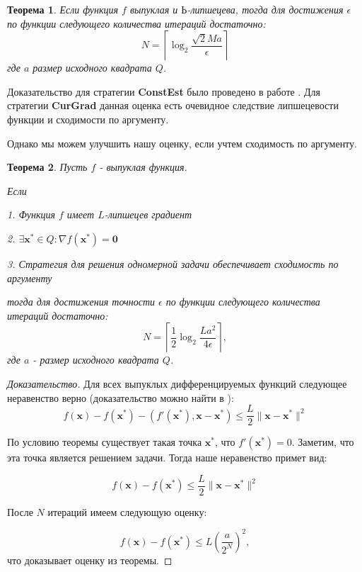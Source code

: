 \documentclass[12pt]{article}
\newtheorem{theorem}{Теорема}[section]
\begin{document}
\begin{theorem}
Если функция $f$ выпуклая и $Ь$-липшецева, тогда для достижения $\epsilon$ по функции следующего количества итераций достаточно:
\begin{equation}\label{NI1}N = \left\lceil\log_2\frac{\sqrt{2}Ma}{\epsilon}\right\rceil\end{equation}
где $a$ размер исходного квадрата $Q$.
\end{theorem}

Доказательство для стратегии \textbf{ConstEst} было проведено в работе \cite{StonPas}. Для стратегии \textbf{CurGrad} данная оценка есть очевидное следствие липшецевости функции и сходимости по аргументу.

Однако мы можем улучшить нашу оценку, если учтем сходимость по аргументу.
\begin{theorem}
Пусть $f$ - выпуклая функция.

Если

1. Функция $f$ имеет $L$-липшецев градиент

2. $\exists \textbf{x}^*\in Q: \nabla f(\textbf{x}^*) = \textbf{0}$

3. Стратегия для решения одномерной задачи обеспечивает сходимость по аргументу

тогда для достижения точности $\epsilon$ по функции следующего количества итераций достаточно:
\begin{equation}\label{NI3}N = \left\lceil\frac{1}{2}\log_2\frac{La^2}{4\epsilon}\right\rceil,
\end{equation}
где $a$ - размер исходного квадрата $Q$.
\end{theorem}

\begin{proof}[Доказательство]
Для всех выпуклых дифференцируемых функций следующее неравенство верно (доказательство можно найти в \cite{Nesterov}):
$$f(\textbf{x}) - f(\textbf{x}^*) - (f'(\textbf{x}^*), \textbf{x} - \textbf{x}^*) \leq \frac{L}{2}\|\textbf{x}-\textbf{x}^*\|^2$$

По условию теоремы существует такая точка $\textbf{x}^*$, что $f'(\textbf{x}^*) = 0$. Заметим, что эта точка является решением задачи. Тогда наше неравенство примет вид:

$$f(\textbf{x}) - f(\textbf{x}^*)\leq \frac{L}{2}\|\textbf{x}-\textbf{x}^*\|^2$$

После $N$ итераций имеем следующую оценку:

$$f(\textbf{x}) - f(\textbf{x}^*)\leq L\left(\frac{a}{2^N}\right)^2,$$
что доказывает оценку из теоремы.
\end{proof}
\end{document}
